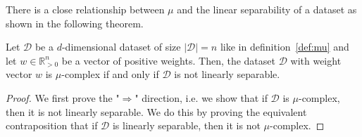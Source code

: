 There is a close relationship between $\mu$ and the linear
separability of a dataset as shown in the following theorem.

\begin{theorem}
    \label{theorem:mu-linear-separability}
    Let $\mathcal{D}$ be a $d$-dimensional dataset of size
    $|\mathcal{D}| = n$ like in definition~\ref{def:mu}
    and let $w \in \mathbb{R}^n_{>0}$ be a vector of
    positive weights.
    Then, the dataset
    $\mathcal{D}$ with weight vector $w$ is $\mu$-complex
    if and only if $\mathcal{D}$ is not linearly separable.
\end{theorem}
\begin{proof}
    We first prove the "$\Rightarrow$" direction, i.e. we show
    that if $\mathcal{D}$ is $\mu$-complex,
    then it is not linearly separable.
    We do this by proving the equivalent
    contraposition that if $\mathcal{D}$ is linearly separable,
    then it is not $\mu$-complex.


\end{proof}
